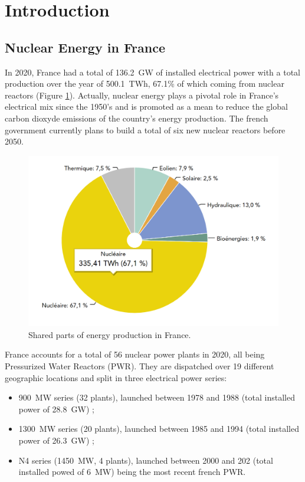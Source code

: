 
\chapter*{Introduction} %

\label{ch:introduction} %


\minitoc

\section*{Nuclear Energy in France}

In 2020, France had a total of 136.2~GW of installed electrical power with a total production over the year of 500.1~TWh, 67.1\% of which coming from nuclear reactors (Figure \ref{fig:france_energy_mix}). Actually, nuclear energy plays a pivotal role in France's electrical mix since the 1950's and is promoted as a mean to reduce the global carbon dioxyde emissions of the country's energy production. The french government currently plans to build a total of six new nuclear reactors before 2050.

\begin{figure}[!h]
\centering
\includegraphics[width=0.6\linewidth]{img/intro/energy_mix.PNG}
\caption{Shared parts of energy production in France. \cite{rte_website} }
\label{fig:france_energy_mix}
\end{figure}

\npar

France accounts for a total of 56 nuclear power plants in 2020, all being Pressurized Water Reactors (PWR). They are dispatched over 19 different geographic locations and split in three electrical power series:

\begin{itemize}
\item 900~MW series (32 plants), launched between 1978 and 1988 (total installed power of 28.8~GW) ;
\item 1300~MW series (20 plants), launched between 1985 and 1994 (total installed power of 26.3~GW) ;
\item N4 series (1450~MW, 4 plants), launched between 2000 and 202 (total installed powed of 6~MW) being the most recent french PWR.
\end{itemize}


